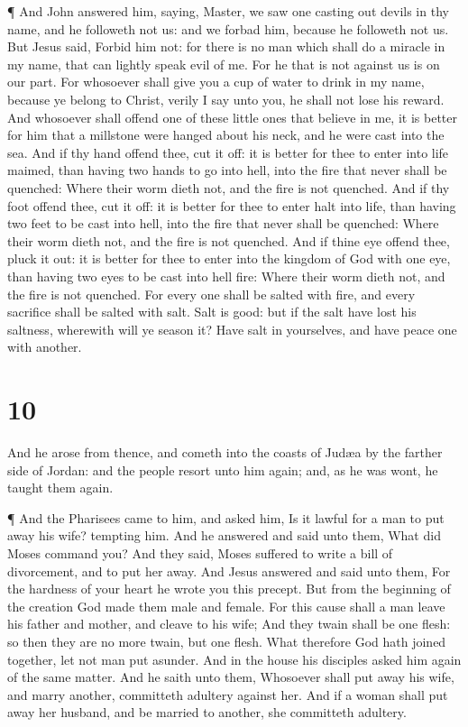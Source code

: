  ¶ And John answered him, saying, Master, we saw one
casting out devils in thy name, and he followeth not us: and we forbad
him, because he followeth not us.  But Jesus said, Forbid
him not: for there is no man which shall do a miracle in my name, that
can lightly speak evil of me.  For he that is not against
us is on our part.  For whosoever shall give you a cup of
water to drink in my name, because ye belong to Christ, verily I say
unto you, he shall not lose his reward.  And whosoever
shall offend one of these little ones that believe in me, it is better
for him that a millstone were hanged about his neck, and he were cast
into the sea.  And if thy hand offend thee, cut it off: it
is better for thee to enter into life maimed, than having two hands to
go into hell, into the fire that never shall be quenched: 
Where their worm dieth not, and the fire is not quenched. 
And if thy foot offend thee, cut it off: it is better for thee to enter
halt into life, than having two feet to be cast into hell, into the fire
that never shall be quenched:  Where their worm dieth not,
and the fire is not quenched.  And if thine eye offend
thee, pluck it out: it is better for thee to enter into the kingdom of
God with one eye, than having two eyes to be cast into hell fire:
 Where their worm dieth not, and the fire is not quenched.
 For every one shall be salted with fire, and every
sacrifice shall be salted with salt.  Salt is good: but if
the salt have lost his saltness, wherewith will ye season it? Have salt
in yourselves, and have peace one with another.

\hypertarget{section-9}{%
\section{10}\label{section-9}}

 And he arose from thence, and cometh into the coasts of
Judæa by the farther side of Jordan: and the people resort unto him
again; and, as he was wont, he taught them again.

 ¶ And the Pharisees came to him, and asked him, Is it
lawful for a man to put away his wife? tempting him.  And he
answered and said unto them, What did Moses command you? 
And they said, Moses suffered to write a bill of divorcement, and to put
her away.  And Jesus answered and said unto them, For the
hardness of your heart he wrote you this precept.  But from
the beginning of the creation God made them male and female.
 For this cause shall a man leave his father and mother, and
cleave to his wife;  And they twain shall be one flesh: so
then they are no more twain, but one flesh.  What therefore
God hath joined together, let not man put asunder.  And in
the house his disciples asked him again of the same matter.
 And he saith unto them, Whosoever shall put away his wife,
and marry another, committeth adultery against her.  And if
a woman shall put away her husband, and be married to another, she
committeth adultery.

